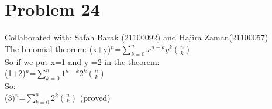 \documentclass{article}
\begin{document}
\section{Problem 24}
Collaborated with: Safah Barak (21100092) and Hajira Zaman(21100057)\\
The binomial theorem: (x+y)$^{n}$=$\sum_{k=0}^{n} x^{n-k} y^{k} {n\choose k}$ \\
So if we put x=1 and y =2 in the theorem:\\
(1+2)$^{n}$=$\sum_{k=0}^{n} 1^{n-k} 2^{k} {n\choose k}$\\
So:\\
(3)$^{n}$=$\sum_{k=0}^{n}2^{k} {n\choose k}$ (proved)\\
\end{document}
